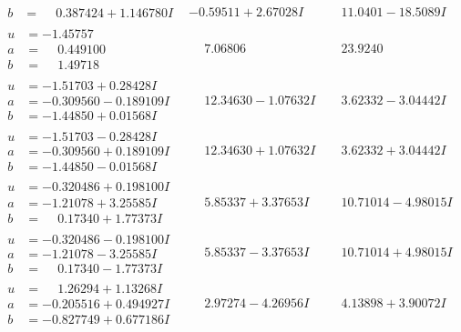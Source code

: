 \documentclass[1p]{elsarticle_modified}
\theoremstyle{definition}
\begin{document}
$$\begin{array}{c|c|c}
\begin{aligned}
b &= \phantom{-}0.387424 + 1.146780 I\end{aligned}
 & -0.59511 + 2.67028 I & \phantom{-}11.0401 - 18.5089 I \\ \hline\begin{aligned}
u &= -1.45757\phantom{ +0.000000I} \\
a &= \phantom{-}0.449100\phantom{ +0.000000I} \\
b &= \phantom{-}1.49718\phantom{ +0.000000I}\end{aligned}
 & \phantom{-}7.06806\phantom{ +0.000000I} & \phantom{-}23.9240\phantom{ +0.000000I} \\ \hline\begin{aligned}
u &= -1.51703 + 0.28428 I \\
a &= -0.309560 - 0.189109 I \\
b &= -1.44850 + 0.01568 I\end{aligned}
 & \phantom{-}12.34630 - 1.07632 I & \phantom{-}3.62332 - 3.04442 I \\ \hline\begin{aligned}
u &= -1.51703 - 0.28428 I \\
a &= -0.309560 + 0.189109 I \\
b &= -1.44850 - 0.01568 I\end{aligned}
 & \phantom{-}12.34630 + 1.07632 I & \phantom{-}3.62332 + 3.04442 I \\ \hline\begin{aligned}
u &= -0.320486 + 0.198100 I \\
a &= -1.21078 + 3.25585 I \\
b &= \phantom{-}0.17340 + 1.77373 I\end{aligned}
 & \phantom{-}5.85337 + 3.37653 I & \phantom{-}10.71014 - 4.98015 I \\ \hline\begin{aligned}
u &= -0.320486 - 0.198100 I \\
a &= -1.21078 - 3.25585 I \\
b &= \phantom{-}0.17340 - 1.77373 I\end{aligned}
 & \phantom{-}5.85337 - 3.37653 I & \phantom{-}10.71014 + 4.98015 I \\ \hline\begin{aligned}
u &= \phantom{-}1.26294 + 1.13268 I \\
a &= -0.205516 + 0.494927 I \\
b &= -0.827749 + 0.677186 I\end{aligned}
 & \phantom{-}2.97274 - 4.26956 I & \phantom{-}4.13898 + 3.90072 I \\ \hline\begin{aligned}

\end{aligned}
\end{array}$$
\end{document}
